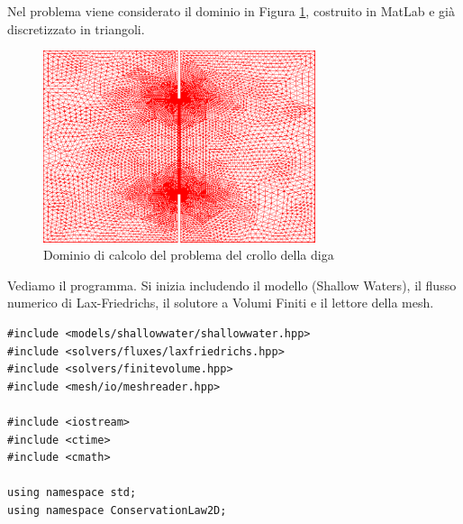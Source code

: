 Nel problema viene considerato il dominio in Figura \ref{fig:dambreakdominio}, costruito in MatLab e già discretizzato in triangoli.
\begin{figure}[htb]
\centering
\includegraphics[width=8cm]{images/dambreak2dmesh.pdf}
\caption{Dominio di calcolo del problema del crollo della diga} \label{fig:dambreakdominio}
\end{figure}

Vediamo il programma. Si inizia includendo il modello (Shallow Waters), il flusso numerico di Lax-Friedrichs, il solutore a Volumi Finiti e il lettore della mesh.
\begin{lstlisting}[name=dambreak2d]
#include <models/shallowwater/shallowwater.hpp>
#include <solvers/fluxes/laxfriedrichs.hpp>
#include <solvers/finitevolume.hpp>
#include <mesh/io/meshreader.hpp>

#include <iostream>
#include <ctime>
#include <cmath>

using namespace std;
using namespace ConservationLaw2D;
\end{lstlisting}

